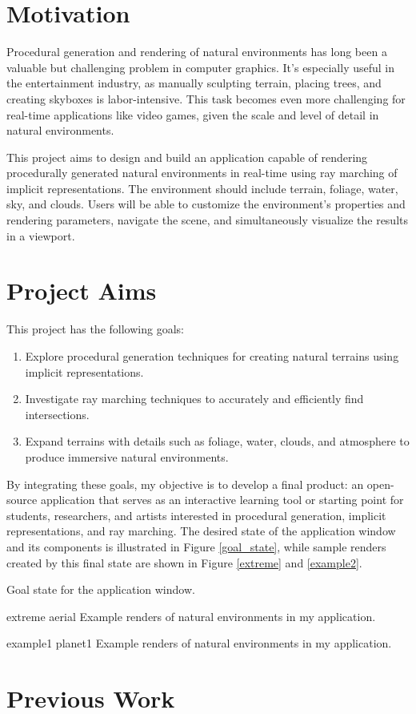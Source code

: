 \label{Introduction}

\section{Motivation}
\label{Motivation}

Procedural generation and rendering of natural environments has long been a valuable but challenging problem in computer graphics. It's especially useful in the entertainment industry, as manually sculpting terrain, placing trees, and creating skyboxes is labor-intensive. This task becomes even more challenging for real-time applications like video games, given the scale and level of detail in natural environments.

This project aims to design and build an application capable of rendering procedurally generated natural environments in real-time using ray marching of implicit representations. The environment should include terrain, foliage, water, sky, and clouds. Users will be able to customize the environment's properties and rendering parameters, navigate the scene, and simultaneously visualize the results in a viewport.

\section{Project Aims}
\label{Project Aims}

This project has the following goals:

\begin{enumerate}
	\item Explore procedural generation techniques for creating natural terrains using implicit representations.
	\item Investigate ray marching techniques to accurately and efficiently find intersections.
	\item Expand terrains with details such as foliage, water, clouds, and atmosphere to produce immersive natural environments.
\end{enumerate}

By integrating these goals, my objective is to develop a final product: an open-source application that serves as an interactive learning tool or starting point for students, researchers, and artists interested in procedural generation, implicit representations, and ray marching. The desired state of the application window and its components is illustrated in Figure \ref{goal_state}, while sample renders created by this final state are shown in Figure \ref{extreme} and \ref{example2}.

{Goal state for the application window.}

{extreme}{}
{aerial}{}
{Example renders of natural environments in my application.}

{example1}{}
{planet1}{}
{Example renders of natural environments in my application.}

\section{Previous Work}
\label{Previous Work}
